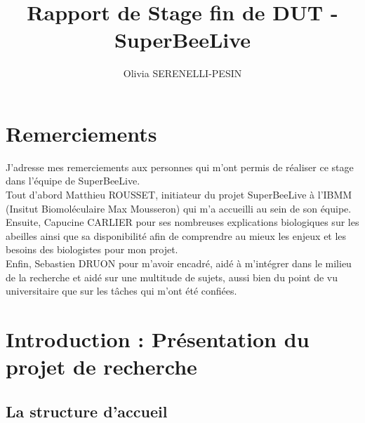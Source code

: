 \documentclass[11pt, french]{report}
\title{Rapport de Stage fin de DUT - SuperBeeLive}
\author{Olivia SERENELLI-PESIN}
\begin{document}
\maketitle

\clearpage
\newpage 

\section*{Remerciements}

J’adresse mes remerciements aux personnes qui m’ont permis de réaliser ce stage dans l’équipe de SuperBeeLive. \\
Tout d’abord Matthieu ROUSSET, initiateur du projet SuperBeeLive à l'IBMM (Insitut Biomoléculaire Max Mousseron) 
qui m’a accueilli au sein de son équipe. \\
Ensuite, Capucine CARLIER pour ses nombreuses explications biologiques sur les abeilles ainsi que sa disponibilité 
afin de comprendre au mieux les enjeux et les besoins des biologistes pour mon projet. \\
Enfin, Sebastien DRUON pour m’avoir encadré, aidé à m’intégrer dans le milieu de la recherche et aidé sur une multitude 
de sujets, aussi bien du point de vu universitaire que sur les tâches qui m’ont été confiées. \\

\tableofcontents
\clearpage

\section{Introduction : Présentation du projet de recherche}
\subsection{La structure d'accueil} 
\end{document}
